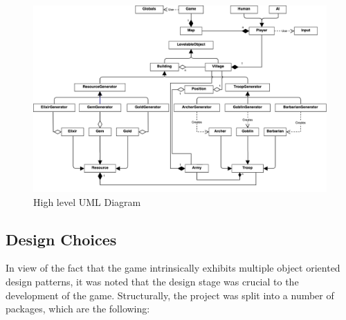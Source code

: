 \documentclass{article}
\begin{document}
\vspace{3em}
\begin{figure}[h]
	\centering
	\includegraphics[width=1\textwidth]{images/coc-uml.png}
	\caption{High level UML Diagram}
\end{figure}

\newpage

\subsection{Design Choices}

In view of the fact that the game intrinsically exhibits multiple object oriented design 
patterns, it was noted that the design stage was crucial to the development of the game. Structurally,
the project was split into a number of packages, which are the following:
\end{document}
